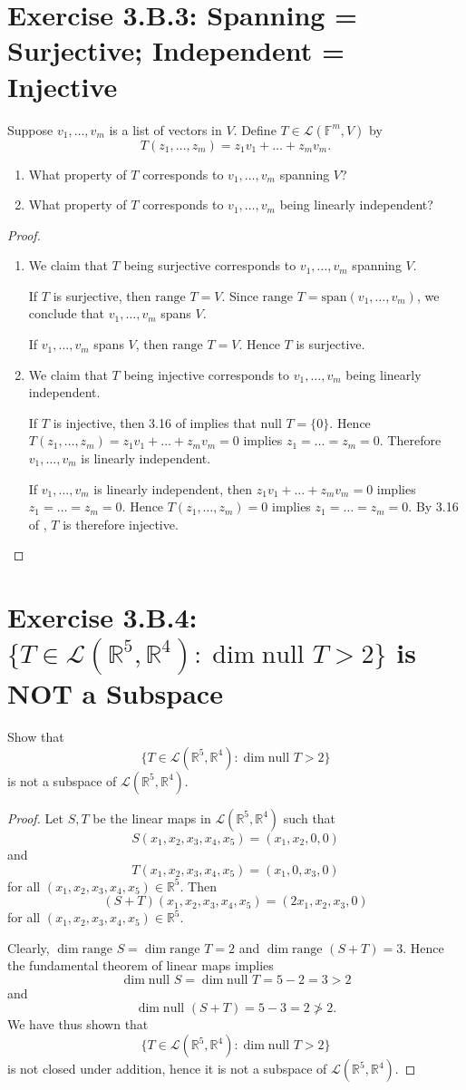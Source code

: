 \section{Exercise 3.B.3: Spanning = Surjective; Independent = Injective}
Suppose $v_1,\dots,v_m$ is a list of vectors in $V$. Define $T\in\mathcal{L}(\mathbb{F}^m,V)$ by\[
T(z_1,\dots,z_m)=z_1v_1+\dots+z_mv_m.
\]
\begin{enumerate}[label=(\alph*)]
\item What property of $T$ corresponds to $v_1,\dots,v_m$ spanning $V$?
\item What property of $T$ corresponds to $v_1,\dots,v_m$ being linearly independent?
\end{enumerate}
\begin{proof}
\begin{enumerate}[label=(\alph*)]
\item We claim that $T$ being surjective corresponds to $v_1,\dots,v_m$ spanning $V$.

If $T$ is surjective, then $\text{range }T=V$. Since $\text{range }T=\text{span}(v_1,\dots,v_m)$, we conclude that $v_1,\dots,v_m$ spans $V$.

If $v_1,\dots,v_m$ spans $V$, then $\text{range }T=V$. Hence $T$ is surjective.
\item We claim that $T$ being injective corresponds to $v_1,\dots,v_m$ being linearly independent.

If $T$ is injective, then 3.16 of \cite{axler2014linear} implies that $\text{null }T=\{0\}$. Hence $T(z_1,\dots,z_m)=z_1v_1+\dots+z_mv_m=0$ implies $z_1=\dots=z_m=0$. Therefore $v_1,\dots,v_m$ is linearly independent.

If $v_1,\dots,v_m$ is linearly independent, then $z_1v_1+\dots+z_mv_m=0$ implies $z_1=\dots=z_m=0$. Hence $T(z_1,\dots,z_m)=0$ implies $z_1=\dots=z_m=0$. By 3.16 of \cite{axler2014linear}, $T$ is therefore injective.
\end{enumerate}
\end{proof}
\section{Exercise 3.B.4: $\{T\in\mathcal{L}(\mathbb{R}^5,\mathbb{R}^4):\dim\text{null }T>2\}$ is NOT a Subspace}
Show that\[
\{T\in\mathcal{L}(\mathbb{R}^5,\mathbb{R}^4):\dim\text{null }T>2\}
\]
is not a subspace of $\mathcal{L}(\mathbb{R}^5,\mathbb{R}^4)$.
\begin{proof}
Let $S,T$ be the linear maps in $\mathcal{L}(\mathbb{R}^5,\mathbb{R}^4)$ such that\[
S(x_1,x_2,x_3,x_4,x_5)=(x_1,x_2,0,0)
\]and\[
T(x_1,x_2,x_3,x_4,x_5)=(x_1,0,x_3,0)
\]for all $(x_1,x_2,x_3,x_4,x_5)\in\mathbb{R}^5$. Then\[
(S+T)(x_1,x_2,x_3,x_4,x_5)=(2x_1,x_2,x_3,0)
\]for all $(x_1,x_2,x_3,x_4,x_5)\in\mathbb{R}^5$. 

Clearly, $\dim\text{range }S=\dim\text{range }T=2$ and $\dim\text{range }(S+T)=3$. Hence the fundamental theorem of linear maps implies\[
\dim\text{null }S=\dim\text{null }T=5-2=3>2
\]and\[
\dim\text{null }(S+T)=5-3=2\not>2.
\]We have thus shown that\[
\{T\in\mathcal{L}(\mathbb{R}^5,\mathbb{R}^4):\dim\text{null }T>2\}
\] is not closed under addition, hence it is not a subspace of $\mathcal{L}(\mathbb{R}^5,\mathbb{R}^4)$.
\end{proof}
